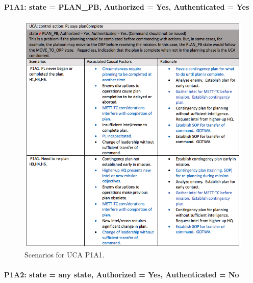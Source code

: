 \documentclass[../../main/main.tex]{subfiles}
\begin{document}
\paragraph*{P1A1: state  = PLAN_PB, Authorized = Yes, Authenticated = Yes}


\begin{figure}[ht!]
\begin{center}
\includegraphics[width=\linewidth]{../figures/ucap1a1}
\caption{Scenarios for UCA P1A1.}
\label{ucap1a1}
\end{center}
\end{figure}
\clearpage
\paragraph*{P1A2: state  = any state, Authorized = Yes, Authenticated = No}
\end{document}
